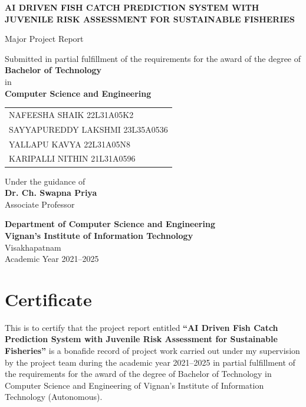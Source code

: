 \documentclass[12pt,a4paper]{report}
\begin{document}
\begin{titlepage}
\centering
\vspace*{1.5cm}
{\Large \textbf{AI DRIVEN FISH CATCH PREDICTION SYSTEM WITH JUVENILE RISK ASSESSMENT FOR SUSTAINABLE FISHERIES}\par}
\vspace{1.5cm}
{\large Major Project Report\par}
\vspace{0.8cm}
Submitted in partial fulfillment of the requirements for the award of the degree of\\
\textbf{Bachelor of Technology}\\
in\\
\textbf{Computer Science and Engineering}

\vspace{1.5cm}
\begin{tabular}{l}
NAFEESHA SHAIK \hspace{1cm} 22L31A05K2 \\
SAYYAPUREDDY LAKSHMI \hspace{1cm} 23L35A0536 \\
YALLAPU KAVYA \hspace{1cm} 22L31A05N8 \\
KARIPALLI NITHIN \hspace{1cm} 21L31A0596 \\
\end{tabular}

\vspace{1.2cm}
Under the guidance of\\
\textbf{Dr. Ch. Swapna Priya}\\
Associate Professor

\vfill
\textbf{Department of Computer Science and Engineering}\\
\textbf{Vignan's Institute of Information Technology}\\
Visakhapatnam\\
Academic Year 2021--2025
\end{titlepage}

\chapter*{Certificate}
This is to certify that the project report entitled \textbf{``AI Driven Fish Catch Prediction System with Juvenile Risk Assessment for Sustainable Fisheries''} is a bonafide record of project work carried out under my supervision by the project team during the academic year 2021--2025 in partial fulfillment of the requirements for the award of the degree of Bachelor of Technology in Computer Science and Engineering of Vignan's Institute of Information Technology (Autonomous).
\end{document}

